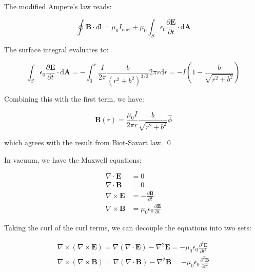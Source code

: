 \documentclass[12pt]{article}
\begin{document}
The modified Ampere's law reads:

\begin{equation}
    \oint \mathbf{B} \cdot d\mathbf{l} = \mu_{0} I_{\text{encl}} + \mu_{0} \int_{S} \epsilon_{0} \frac{\partial \mathbf{E}}{\partial t} \cdot \mathrm{d}\mathbf{A}
\end{equation}

The surface integral evaluates to:

\begin{equation}
    \int_{S} \epsilon_{0} \frac{\partial \mathbf{E}}{\partial t} \cdot \mathrm{d}\mathbf{A} = - \int_{0}^{r} \frac{I}{2\pi} \frac{b}{(r^{2} + b^{2})^{3/2}} 2\pi r \mathrm{d}r = -I \left( 1 - \frac{b}{\sqrt{r^{2} + b^{2}}} \right)
\end{equation}

Combining this with the first term, we have:

\begin{equation}
    \mathbf{B}(r)= \frac{\mu_{0} I}{2\pi r} \frac{b}{\sqrt{r^{2} + b^{2}}} \hat{\phi}
\end{equation}

which agrees with the result from Biot-Savart law.
\qed



In vacuum, we have the Maxwell equations:

\begin{equation}
\begin{split}
    \nabla \cdot \mathbf{E} &= 0 \\
    \nabla \cdot \mathbf{B} &= 0 \\
    \nabla \times \mathbf{E} &= -\frac{\partial \mathbf{B}}{\partial t} \\
    \nabla \times \mathbf{B} &= \mu_{0} \epsilon_{0} \frac{\partial \mathbf{E}}{\partial t}
\end{split}
\end{equation}

Taking the curl of the curl terms, we can decouple the equations into two sets:

\begin{equation}
\begin{split}
    \nabla \times ( \nabla \times \mathbf{E} ) = \nabla (\nabla \cdot \mathbf{E}) - \nabla^{2} \mathbf{E} = -\mu_{0} \epsilon_{0} \frac{\partial^{2} \mathbf{E}}{\partial t^{2}} \\
    \nabla \times ( \nabla \times \mathbf{B} ) = \nabla (\nabla \cdot \mathbf{B}) - \nabla^{2} \mathbf{B} = -\mu_{0} \epsilon_{0} \frac{\partial^{2} \mathbf{B}}{\partial t^{2}}
\end{split}
\end{equation}
\end{document}
